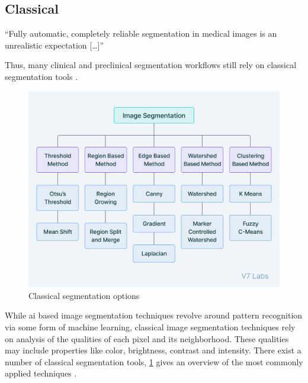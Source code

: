\subsection{Classical}\label{s:b-seg-techniques}
\begin{displayquote}
	``Fully automatic, completely reliable segmentation in medical images is an unrealistic expectation [\ldots]''
\end{displayquote}
Thus, many clinical and preclinical segmentation workflows still rely on classical segmentation tools \cite{yuTechniquesChallengesImage2023}.
\begin{figure}[h]
	\centerline{
		\includegraphics[scale=0.5]{images/classicalSegTree.png}}
	\caption{Classical segmentation options \cite{v7labsIntroductionImageSegmentation2021}}\label{fig:classicalSegTree}
\end{figure}
\noindent
While \acrshort{ai} based image segmentation techniques revolve around pattern recognition
via some form of machine learning,
classical image segmentation techniques rely on analysis of the qualities of each pixel and its neighborhood.
These qualities may include properties like color, brightness, contrast and intensity.
There exist a number of classical segmentation tools,
\cref{fig:classicalSegTree} gives an overview of the most commonly applied techniques
\cite{yuTechniquesChallengesImage2023,baliReviewStrategiesTechniques2015}.

